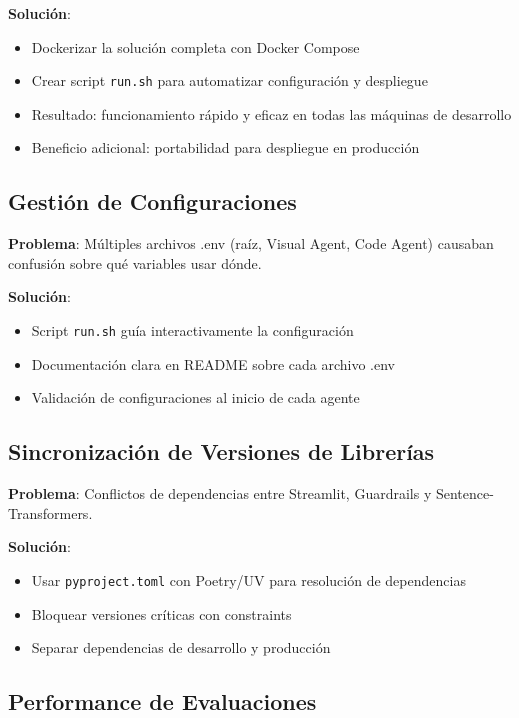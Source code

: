 \documentclass[12pt,a4paper]{article}
\begin{document}
\textbf{Solución}:
\begin{itemize}
    \item Dockerizar la solución completa con Docker Compose
    \item Crear script \texttt{run.sh} para automatizar configuración y despliegue
    \item Resultado: funcionamiento rápido y eficaz en todas las máquinas de desarrollo
    \item Beneficio adicional: portabilidad para despliegue en producción
\end{itemize}

\subsection{Gestión de Configuraciones}

\textbf{Problema}: Múltiples archivos .env (raíz, Visual Agent, Code Agent) causaban confusión sobre qué variables usar dónde.

\textbf{Solución}:
\begin{itemize}
    \item Script \texttt{run.sh} guía interactivamente la configuración
    \item Documentación clara en README sobre cada archivo .env
    \item Validación de configuraciones al inicio de cada agente
\end{itemize}

\subsection{Sincronización de Versiones de Librerías}

\textbf{Problema}: Conflictos de dependencias entre Streamlit, Guardrails y Sentence-Transformers.

\textbf{Solución}:
\begin{itemize}
    \item Usar \texttt{pyproject.toml} con Poetry/UV para resolución de dependencias
    \item Bloquear versiones críticas con constraints
    \item Separar dependencias de desarrollo y producción
\end{itemize}

\subsection{Performance de Evaluaciones}
\end{document}
